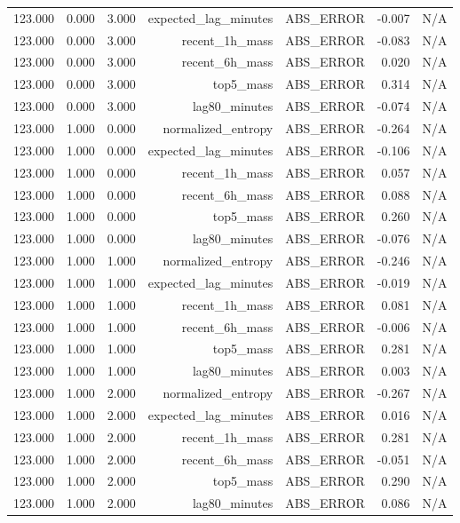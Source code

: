 \begin{table}[h!]
\begin{tabular}{lrrrrrr}
123.000 & 0.000 & 3.000 & expected\_lag\_minutes & ABS\_ERROR & -0.007 & N/A \\
123.000 & 0.000 & 3.000 & recent\_1h\_mass & ABS\_ERROR & -0.083 & N/A \\
123.000 & 0.000 & 3.000 & recent\_6h\_mass & ABS\_ERROR & 0.020 & N/A \\
123.000 & 0.000 & 3.000 & top5\_mass & ABS\_ERROR & 0.314 & N/A \\
123.000 & 0.000 & 3.000 & lag80\_minutes & ABS\_ERROR & -0.074 & N/A \\
123.000 & 1.000 & 0.000 & normalized\_entropy & ABS\_ERROR & -0.264 & N/A \\
123.000 & 1.000 & 0.000 & expected\_lag\_minutes & ABS\_ERROR & -0.106 & N/A \\
123.000 & 1.000 & 0.000 & recent\_1h\_mass & ABS\_ERROR & 0.057 & N/A \\
123.000 & 1.000 & 0.000 & recent\_6h\_mass & ABS\_ERROR & 0.088 & N/A \\
123.000 & 1.000 & 0.000 & top5\_mass & ABS\_ERROR & 0.260 & N/A \\
123.000 & 1.000 & 0.000 & lag80\_minutes & ABS\_ERROR & -0.076 & N/A \\
123.000 & 1.000 & 1.000 & normalized\_entropy & ABS\_ERROR & -0.246 & N/A \\
123.000 & 1.000 & 1.000 & expected\_lag\_minutes & ABS\_ERROR & -0.019 & N/A \\
123.000 & 1.000 & 1.000 & recent\_1h\_mass & ABS\_ERROR & 0.081 & N/A \\
123.000 & 1.000 & 1.000 & recent\_6h\_mass & ABS\_ERROR & -0.006 & N/A \\
123.000 & 1.000 & 1.000 & top5\_mass & ABS\_ERROR & 0.281 & N/A \\
123.000 & 1.000 & 1.000 & lag80\_minutes & ABS\_ERROR & 0.003 & N/A \\
123.000 & 1.000 & 2.000 & normalized\_entropy & ABS\_ERROR & -0.267 & N/A \\
123.000 & 1.000 & 2.000 & expected\_lag\_minutes & ABS\_ERROR & 0.016 & N/A \\
123.000 & 1.000 & 2.000 & recent\_1h\_mass & ABS\_ERROR & 0.281 & N/A \\
123.000 & 1.000 & 2.000 & recent\_6h\_mass & ABS\_ERROR & -0.051 & N/A \\
123.000 & 1.000 & 2.000 & top5\_mass & ABS\_ERROR & 0.290 & N/A \\
123.000 & 1.000 & 2.000 & lag80\_minutes & ABS\_ERROR & 0.086 & N/A \\

\end{tabular}
\end{table}
